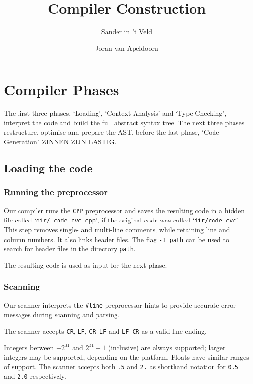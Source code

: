 \documentclass[a4paper,11pt]{report}
\title{Compiler Construction}
\author{Sander in 't Veld \and Joran van Apeldoorn}
\begin{document}
\maketitle
\tableofcontents


\chapter{Compiler Phases}
The first three phases, `Loading', `Context Analysis' and `Type Checking', interpret the code and build the full abstract syntax tree. The next three phases restructure, optimise and prepare the AST, before the last phase, `Code Generation'. ZINNEN ZIJN LASTIG.

\section{Loading the code}
\subsection{Running the preprocessor}
Our compiler runs the \texttt{CPP} preprocessor and saves the resulting code in a hidden file called `\texttt{dir/.code.cvc.cpp}', if the original code was called `\texttt{dir/code.cvc}'. This step removes single- and multi-line comments, while retaining line and column numbers. It also links header files. The flag \texttt{-I path} can be used to search for header files in the directory \texttt{path}.

The resulting code is used as input for the next phase.

\subsection{Scanning}
Our scanner interprets the \texttt{\#line} preprocessor hints to provide accurate error messages during scanning and parsing.

The scanner accepts \texttt{CR}, \texttt{LF}, \texttt{CR LF} and \texttt{LF CR} as a valid line ending.

Integers between $-2^{31}$ and $2^{31}-1$ (inclusive) are always supported; larger integers may be supported, depending on the platform. Floats have similar ranges of support. The scanner accepts both \texttt{.5} and \texttt{2.} as shorthand notation for \texttt{0.5} and \texttt{2.0} respectively.
\end{document}
